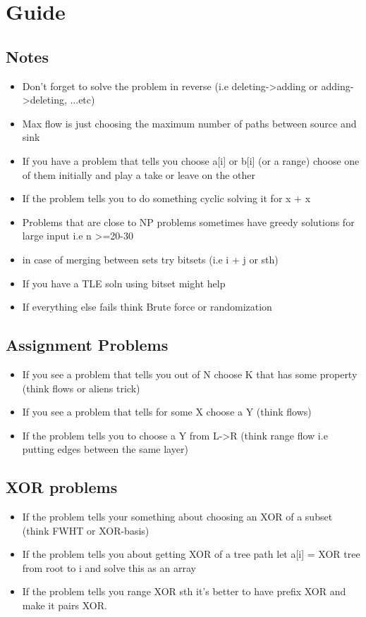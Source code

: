 \section{Guide}
\subsection{Notes}
\begin{itemize}
\item Don't forget to solve the problem in reverse (i.e deleting->adding or adding->deleting, ...etc)
\item Max flow is just choosing the maximum number of paths between source and sink
\item If you have a problem that tells you choose a[i] or b[i] (or a range) choose one of them initially and play a take or leave on the other
\item If the problem tells you to do something cyclic solving it for x + x
\item Problems that are close to NP problems sometimes have greedy solutions for large input i.e n >=20-30
\item in case of merging between sets try bitsets (i.e i + j or sth)
\item If you have a TLE soln using bitset might help
\item If everything else fails think Brute force or randomization
\end{itemize}
\hrulefill
\subsection{Assignment Problems}
\begin{itemize}
\item If you see a problem that tells you out of N choose K that has some property (think flows or aliens trick)
\item If you see a problem that tells for some X choose a Y (think flows)
\item If the problem tells you to choose a Y from L->R (think range flow i.e putting edges between the same layer)
\end{itemize}
\hrulefill
\subsection{XOR problems}
\begin{itemize}
\item If the problem tells your something about choosing an XOR of a subset (think FWHT or XOR-basis)
\item If the problem tells you about getting XOR of a tree path let a[i] = XOR tree from root to i and solve this as an array
\item If the problem tells you range XOR sth it's better to have prefix XOR and make it pairs XOR.
\end{itemize}
\hrulefill
